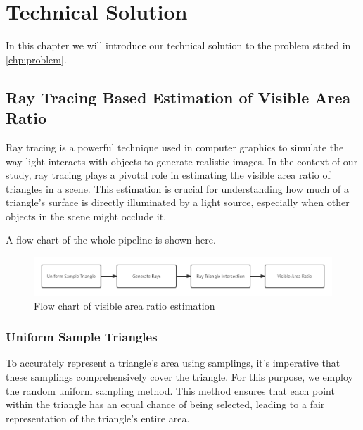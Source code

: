 \documentclass[11pt, a4paper,oneside,chapterprefix=false]{scrbook}
\begin{document}
\chapter{Technical Solution} \label{chp:solution}

In this chapter we will introduce our technical solution to the problem stated in \ref{chp:problem}.

\section{Ray Tracing Based Estimation of Visible Area Ratio} \label{sec:ray tracing visible area ratio}

Ray tracing is a powerful technique used in computer graphics to simulate the way light interacts with objects to generate realistic images. In the context of our study, ray tracing plays a pivotal role in estimating the visible area ratio of triangles in a scene. This estimation is crucial for understanding how much of a triangle's surface is directly illuminated by a light source, especially when other objects in the scene might occlude it.

A flow chart of the whole pipeline is shown here.

\begin{minipage}{\textwidth}
	\begin{figure}[H]
		\centering
		\includegraphics*[width=1.0\textwidth]{figures/visible area.png}
		\caption{Flow chart of visible area ratio estimation}
		\label{fig:visible area ratio estimation}
	\end{figure}
\end{minipage}

\subsection{Uniform Sample Triangles}

To accurately represent a triangle's area using samplings, it's imperative that these samplings comprehensively cover the triangle. For this purpose, we employ the random uniform sampling method. This method ensures that each point within the triangle has an equal chance of being selected, leading to a fair representation of the triangle's entire area.
\end{document}
